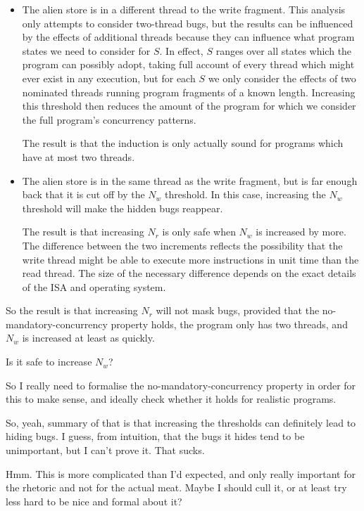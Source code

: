 \documentclass[12pt,a4paper]{book}
\begin{document}
\begin{itemize}
\item
  The alien store is in a different thread to the write fragment.
  This analysis only attempts to consider two-thread bugs, but the results can be influenced by the effects of additional threads because they can influence what program states we need to consider for $S$.
  In effect, $S$ ranges over all states which the program can possibly adopt, taking full account of every thread which might ever exist in any execution, but for each $S$ we only consider the effects of two nominated threads running program fragments of a known length.
  Increasing this threshold then reduces the amount of the program for which we consider the full program's concurrency patterns.

  The result is that the induction is only actually sound for programs which have at most two threads.
\item
  The alien store is in the same thread as the write fragment, but is far enough back that it is cut off by the $N_w$ threshold.
  In this case, increasing the $N_w$ threshold will make the hidden bugs reappear.

  The result is that increasing $N_r$ is only safe when $N_w$ is increased by more.
  The difference between the two increments reflects the possibility that the write thread might be able to execute more instructions in unit time than the read thread.
  The size of the necessary difference depends on the exact details of the ISA and operating system.
\end{itemize}

So the result is that increasing $N_r$ will not mask bugs, provided that the no-mandatory-concurrency property holds, the program only has two threads, and $N_w$ is increased at least as quickly.

Is it safe to increase $N_w$?



So I really need to formalise the no-mandatory-concurrency property in order for this to make sense, and ideally check whether it holds for realistic programs.

So, yeah, summary of that is that increasing the thresholds can definitely lead to hiding bugs.
I guess, from intuition, that the bugs it hides tend to be unimportant, but I can't prove it.
That sucks.

Hmm.
This is more complicated than I'd expected, and only really important for the rhetoric and not for the actual meat.
Maybe I should cull it, or at least try less hard to be nice and formal about it?
\end{document}
